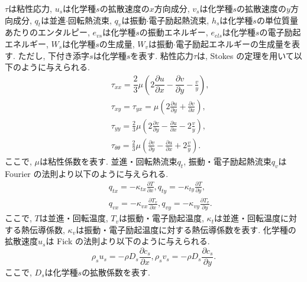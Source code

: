 $\tau$は粘性応力,
$u_s$は化学種$s$の拡散速度の$x$方向成分,
$v_s$は化学種$s$の拡散速度の$y$方向成分,
$q_t$は並進$\cdot$回転熱流束,
$q_v$は振動$\cdot$電子励起熱流束,
$h_s$は化学種$s$の単位質量あたりのエンタルピー,
$e_{vs}$は化学種$s$の振動エネルギー,
$e_{els}$は化学種$s$の電子励起エネルギー,
$W_s$は化学種$s$の生成量,
$W_v$は振動$\cdot$電子励起エネルギーの生成量を表す.
ただし,
下付き添字$s$は化学種$s$を表す.
%
粘性応力$\tau$は,
Stokes の定理を用いて以下のように与えられる.
\begin{eqnarray}
  &&\tau_{xx}=\dfrac{2}{3}\mu \left( 2\dfrac{\partial u}{\partial x}-\dfrac{\partial v}{\partial y}-\frac{v}{y} \right),\\
  &&\tau_{xy}=\tau_{yx}=\mu \left( 2\frac{\partial u}{\partial y}+\frac{\partial v}{\partial x} \right),\\
  &&\tau_{yy}=\frac{2}{3}\mu \left( 2\frac{\partial v}{\partial y}-\frac{\partial u}{\partial x}-2\frac{v}{y} \right),\\
  &&\tau_{\theta \theta}=\frac{2}{3}\mu \left( \frac{\partial v}{\partial y}-\frac{\partial u}{\partial x}+2\frac{v}{y} \right).
\end{eqnarray}
ここで,
$\mu$は粘性係数を表す.
%
並進・回転熱流束$q_t$,
振動・電子励起熱流束$q_v$は Fourier の法則より以下のように与えられる.
\begin{eqnarray}
&&q_{tx}=-\kappa_{tx}\frac{\partial{T}}{\partial{x}}, q_{ty}=-\kappa_{ty}\frac{\partial{T}}{\partial{y}},\\
&&q_{vx}=-\kappa_{vx}\frac{\partial{T_v}}{\partial{x}}, q_{vy}=-\kappa_{vy}\frac{\partial{T_v}}{\partial{y}}.
\end{eqnarray}
ここで,
$T$は並進・回転温度,
$T_v$は振動・電子励起温度,
$\kappa_t$は並進・回転温度に対する熱伝導係数,
$\kappa_v$は振動・電子励起温度に対する熱伝導係数を表す.
%
化学種の拡散速度$u_s$は Fick の法則より以下のように与えられる.
\begin{equation}
\rho_{s}u_{s}=-\rho D_s\frac{\partial{c_s}}{\partial{x}}, \rho_{s}v_{s}=-\rho D_s\frac{\partial{c_s}}{\partial{y}}.
\end{equation}
ここで,
$D_s$は化学種$s$の拡散係数を表す.

